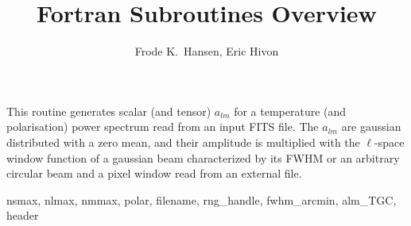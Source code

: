
\sloppy


\title{\healpix Fortran Subroutines Overview}
 \section[create\_alm*]{ }
\label{sub:create_alm}
\author{Frode K.~Hansen, Eric Hivon}

\begin{facility}
{This routine generates scalar (and tensor) $a_{lm}$ for a temperature (and
  polarisation) power spectrum read from an input FITS
file. The $a_{lm}$ are gaussian distributed with a zero mean, and their
  amplitude is multiplied with the $\ell$-space window function of a gaussian
  beam characterized by its FWHM or an arbitrary circular beam
and a pixel window read from an external file.}
{\modAlmTools}
\end{facility}

\begin{f90format}
{nsmax, nlmax, nmmax, polar, filename, rng\_handle, fwhm\_arcmin, alm\_TGC, header }
\end{f90format}
\aboutoptional

